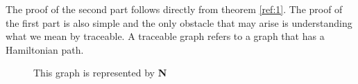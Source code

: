 \documentclass[../basic_graph_theory.tex]{subfiles}
\begin{document}
The proof of the second part follows directly from theorem \ref{ref:1}. The proof of the first part is also simple and the only obstacle that may arise is understanding what we mean by traceable. A traceable graph refers to a graph that has a Hamiltonian path.
\begin{figure}[htbp]
    \begin{center}
    \end{center}
    \caption{This graph is represented by \textbf{N}}
\end{figure}
\end{document}

